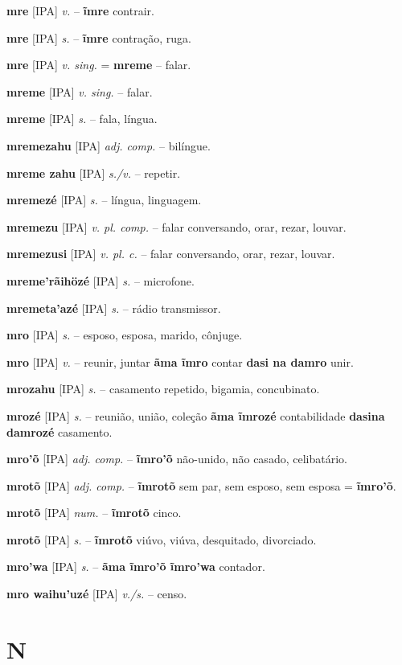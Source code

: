 \textbf{mre} [IPA] \textit{v.} -- \textbf{ĩmre} contrair.

\textbf{mre} [IPA] \textit{s.} -- \textbf{ĩmre} contração, ruga.

\textbf{mre} [IPA] \textit{v. sing.} = \textbf{mreme} -- falar.

\textbf{mreme} [IPA] \textit{v. sing.} -- falar.

\textbf{mreme} [IPA] \textit{s.} -- fala, língua.

\textbf{mremezahu} [IPA] \textit{adj. comp.} -- bilíngue.

\textbf{mreme zahu} [IPA] \textit{s./v.} -- repetir.

\textbf{mremezé} [IPA] \textit{s.} -- língua, linguagem.

\textbf{mremezu} [IPA] \textit{v. pl. comp.} -- falar conversando, orar, rezar, louvar.

\textbf{mremezusi} [IPA] \textit{v. pl. c.} -- falar conversando, orar, rezar, louvar.

\textbf{mreme'rãihözé} [IPA] \textit{s.} -- microfone.

\textbf{mremeta'azé} [IPA] \textit{s.} -- rádio transmissor.

\textbf{mro} [IPA] \textit{s.} -- esposo, esposa, marido, cônjuge.

\textbf{mro} [IPA] \textit{v.} -- reunir, juntar  \textbf{ãma ĩmro} contar  \textbf{dasi na damro} unir.

\textbf{mrozahu} [IPA] \textit{s.} -- casamento repetido, bigamia, concubinato.

\textbf{mrozé} [IPA] \textit{s.} -- reunião, união, coleção  \textbf{ãma ĩmrozé} contabilidade  \textbf{dasina damrozé} casamento.

\textbf{mro'õ} [IPA] \textit{adj. comp.} -- \textbf{ĩmro'õ} não-unido, não casado, celibatário.

\textbf{mrotõ} [IPA] \textit{adj. comp.} -- \textbf{ĩmrotõ} sem par, sem esposo, sem esposa = \textbf{ĩmro'õ}.

\textbf{mrotõ} [IPA] \textit{num.} -- \textbf{ĩmrotõ} cinco.

\textbf{mrotõ} [IPA] \textit{s.} -- \textbf{ĩmrotõ} viúvo, viúva, desquitado, divorciado.

\textbf{mro'wa} [IPA] \textit{s.} -- \textbf{ãma ĩmro'õ ĩmro'wa} contador.

\textbf{mro waihu'uzé} [IPA] \textit{v./s.} -- censo.


\section*{N}

